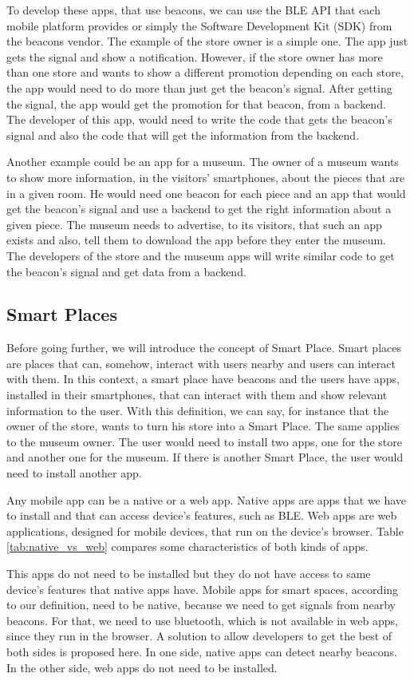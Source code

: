 To develop these apps, that use beacons, we can use the 
BLE API that each 
mobile platform provides or simply the Software
Development Kit (SDK) from the 
beacons vendor. The example of the store owner is a
simple one. The app just gets the signal and show a 
notification. However, if the store owner has more than
one store and wants to show a different promotion depending
on each store, the app would need to do more than just get
the beacon's signal. After getting the signal, the app
would get the promotion for that beacon, from a 
backend. The developer of this app, would need to
write the code that gets the beacon's signal and also
the code that will get the information from the backend.

Another example could be an app for a museum. The owner
of a museum wants to show more information, in the 
visitors' smartphones, about the pieces that are in a given
room. He would need one beacon for each piece and an app
that would get the beacon's signal and use a
backend to get the right information about a given piece.
The museum needs to advertise, to its visitors, that such
an app exists and also, tell them to download the app
before they enter the museum. The developers of the
store and the museum apps will write similar code to get
the beacon's signal and get data from a backend.

\subsection{Smart Places}
\label{sub:smart_places}
Before going further, we will introduce the concept of
Smart Place. Smart places are places that can, somehow,
interact with users nearby and users can interact 
with them.
In this context, a smart place have beacons and the users
have apps, installed in their smartphones, that can interact
with them and show relevant information to the user.
With this definition, we can say, for instance
that the owner of the store, wants to
turn his store into a Smart Place.
The same applies to the museum owner.
The user would need to install two apps, one for the
store and another one for the museum.
If there is another Smart Place, the user would need to
install another app.

Any mobile app can be a native or a web app. Native apps
are apps that we have to install and that can access
device's features, such as BLE. Web apps are web
applications, designed for mobile devices, that run
on the device's browser. Table \ref{tab:native_vs_web}
compares some characteristics of both kinds of apps.

This apps do not need to be
installed but they do not have access
to same device's features that native apps have.
Mobile apps for smart spaces, according to our definition,
need to be native, because we need to get signals from
nearby beacons. For that, we need to use bluetooth, which is
not available in web apps, since they run in the browser.
A solution to allow developers to get the best of both sides
is proposed here. In one side,
native apps can detect nearby beacons. In the other side,
web apps do not need to be installed.

